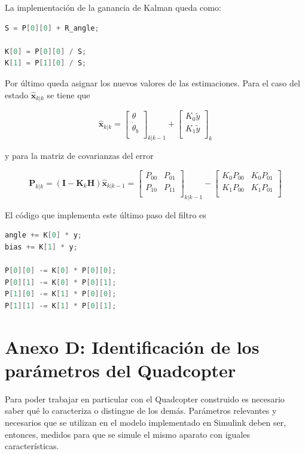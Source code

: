 \documentclass[twoside,11pt]{book}
\begin{document}
La implementación de la ganancia de Kalman queda como:

\begin{lstlisting}[language=C,firstnumber=8]
S = P[0][0] + R_angle;

K[0] = P[0][0] / S;
K[1] = P[1][0] / S;
\end{lstlisting}

Por último queda asignar los nuevos valores de las estimaciones. Para el caso del estado $\hat{\mathbf{x}}_{k|k}$ se tiene que 
 
\begin{equation}
\hat{\mathbf{x}}_{k|k}=\left[\begin{array}{c}
\theta \\
\dot{\theta}_{b} \\ \end{array} \right] _{k|k-1} + \left[\begin{array}{c}
K_{0}\tilde{y} \\
K_{1}\tilde{y} \\ \end{array} \right]_{k}
\end{equation}

y para la matriz de covarianzas del error 

\begin{equation}
\mathbf{P}_{k|k}=(\mathbf{I} - \mathbf{K}_{k}\mathbf{H})\hat{\mathbf{x}}_{k|k-1}=\left[ \begin{array}{cc}
P_{00} & P_{01} \\
P_{10} & P_{11} \\ \end{array} \right]_{k|k-1} - \left[ \begin{array}{cc}
K_{0}P_{00} & K_{0}P_{01} \\
K_{1}P_{00} & K_{1}P_{01} \\ \end{array} \right] 
\end{equation}

El código que implementa este último paso del filtro es 

\begin{lstlisting}[language=C,firstnumber=12]
angle += K[0] * y;
bias += K[1] * y;

P[0][0] -= K[0] * P[0][0];
P[0][1] -= K[0] * P[0][1];
P[1][0] -= K[1] * P[0][0];
P[1][1] -= K[1] * P[0][1];
\end{lstlisting}
\newpage
\section*{Anexo D: Identificación de los parámetros del Quadcopter}
Para poder trabajar en particular con el Quadcopter construido es necesario saber qué lo caracteriza o distingue de los demás. Parámetros relevantes y necesarios que se utilizan en el modelo implementado en Simulink deben ser, entonces, medidos para que se simule el mismo aparato con iguales características. \\
\end{document}
